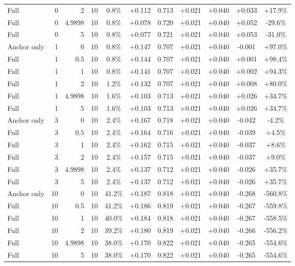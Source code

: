 \begin{table}[htbp]
\begin{tabular}{lrrrccccccc}
Full & 0 & 2 & 10 & 0.8\% & +0.112 & 0.713 & +0.021 & +0.040 & +0.033 & +17.9\% \\
Full & 0 & 4.9898 & 10 & 0.8\% & +0.078 & 0.720 & +0.021 & +0.040 & +0.052 & -29.6\% \\
Full & 0 & 5 & 10 & 0.8\% & +0.077 & 0.721 & +0.021 & +0.040 & +0.053 & -31.0\% \\
Anchor only & 1 & 0 & 10 & 0.8\% & +0.147 & 0.707 & +0.021 & +0.040 & -0.001 & +97.0\% \\
Full & 1 & 0.5 & 10 & 0.8\% & +0.144 & 0.707 & +0.021 & +0.040 & +0.001 & +98.4\% \\
Full & 1 & 1 & 10 & 0.8\% & +0.141 & 0.707 & +0.021 & +0.040 & +0.002 & +94.3\% \\
Full & 1 & 2 & 10 & 1.2\% & +0.132 & 0.707 & +0.021 & +0.040 & +0.008 & +80.0\% \\
Full & 1 & 4.9898 & 10 & 1.6\% & +0.103 & 0.713 & +0.021 & +0.040 & +0.026 & +34.7\% \\
Full & 1 & 5 & 10 & 1.6\% & +0.103 & 0.713 & +0.021 & +0.040 & +0.026 & +34.7\% \\
Anchor only & 3 & 0 & 10 & 2.4\% & +0.167 & 0.718 & +0.021 & +0.040 & -0.042 & -4.2\% \\
Full & 3 & 0.5 & 10 & 2.4\% & +0.164 & 0.716 & +0.021 & +0.040 & -0.039 & +4.5\% \\
Full & 3 & 1 & 10 & 2.4\% & +0.162 & 0.715 & +0.021 & +0.040 & -0.037 & +8.6\% \\
Full & 3 & 2 & 10 & 2.4\% & +0.157 & 0.715 & +0.021 & +0.040 & -0.037 & +9.0\% \\
Full & 3 & 4.9898 & 10 & 2.4\% & +0.137 & 0.712 & +0.021 & +0.040 & -0.026 & +35.7\% \\
Full & 3 & 5 & 10 & 2.4\% & +0.137 & 0.712 & +0.021 & +0.040 & -0.026 & +35.7\% \\
Anchor only & 10 & 0 & 10 & 41.2\% & +0.187 & 0.818 & +0.021 & +0.040 & -0.268 & -560.8\% \\
Full & 10 & 0.5 & 10 & 41.2\% & +0.186 & 0.819 & +0.021 & +0.040 & -0.267 & -559.8\% \\
Full & 10 & 1 & 10 & 40.0\% & +0.184 & 0.818 & +0.021 & +0.040 & -0.267 & -558.5\% \\
Full & 10 & 2 & 10 & 39.2\% & +0.180 & 0.819 & +0.021 & +0.040 & -0.266 & -556.2\% \\
Full & 10 & 4.9898 & 10 & 38.0\% & +0.170 & 0.822 & +0.021 & +0.040 & -0.265 & -554.6\% \\
Full & 10 & 5 & 10 & 38.0\% & +0.170 & 0.822 & +0.021 & +0.040 & -0.265 & -554.6\% \\

\end{tabular}
\end{table}
